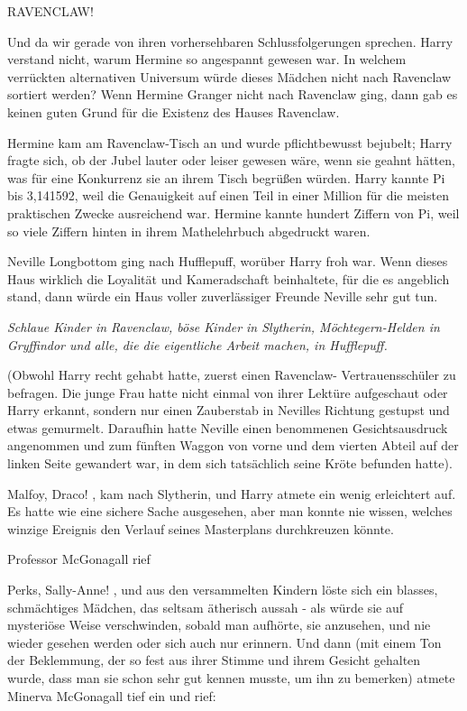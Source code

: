 \glqq RAVENCLAW!\grqq{}

Und da wir gerade von ihren vorhersehbaren Schlussfolgerungen sprechen. Harry
verstand nicht, warum Hermine so angespannt gewesen war. In welchem verrückten
alternativen Universum würde dieses Mädchen nicht nach Ravenclaw sortiert
werden? Wenn Hermine Granger nicht nach Ravenclaw ging, dann gab es keinen guten
Grund für die Existenz des Hauses Ravenclaw.

Hermine kam am Ravenclaw-Tisch an und wurde pflichtbewusst bejubelt; Harry
fragte sich, ob der Jubel lauter oder leiser gewesen wäre, wenn sie geahnt
hätten, was für eine Konkurrenz sie an ihrem Tisch begrüßen würden. Harry kannte
Pi bis 3,141592, weil die Genauigkeit auf einen Teil in einer Million für die
meisten praktischen Zwecke ausreichend war. Hermine kannte hundert Ziffern von
Pi, weil so viele Ziffern hinten in ihrem Mathelehrbuch abgedruckt waren.

Neville Longbottom ging nach Hufflepuff, worüber Harry froh war. Wenn dieses
Haus wirklich die Loyalität und Kameradschaft beinhaltete, für die es angeblich
stand, dann würde ein Haus voller zuverlässiger Freunde Neville sehr gut tun.

\emph{Schlaue Kinder in Ravenclaw, böse Kinder in Slytherin, Möchtegern-Helden
in Gryffindor und alle, die die eigentliche Arbeit machen, in Hufflepuff.}

(Obwohl Harry recht gehabt hatte, zuerst einen Ravenclaw- Vertrauensschüler zu
befragen. Die junge Frau hatte nicht einmal von ihrer Lektüre aufgeschaut oder
Harry erkannt, sondern nur einen Zauberstab in Nevilles Richtung gestupst und
etwas gemurmelt. Daraufhin hatte Neville einen benommenen Gesichtsausdruck
angenommen und zum fünften Waggon von vorne und dem vierten Abteil auf der
linken Seite gewandert war, in dem sich tatsächlich seine Kröte befunden hatte).

\glqq Malfoy, Draco!\grqq{} , kam nach Slytherin, und Harry atmete ein wenig
erleichtert auf. Es hatte wie eine sichere Sache ausgesehen, aber man konnte nie
wissen, welches winzige Ereignis den Verlauf seines Masterplans durchkreuzen
könnte.

Professor McGonagall rief

\glqq Perks, Sally-Anne!\grqq{} , und aus den versammelten Kindern löste sich
ein blasses, schmächtiges Mädchen, das seltsam ätherisch aussah - als würde sie
auf mysteriöse Weise verschwinden, sobald man aufhörte, sie anzusehen, und nie
wieder gesehen werden oder sich auch nur erinnern. Und dann (mit einem Ton der
Beklemmung, der so fest aus ihrer Stimme und ihrem Gesicht gehalten wurde, dass
man sie schon sehr gut kennen musste, um ihn zu bemerken) atmete Minerva
McGonagall tief ein und rief:

